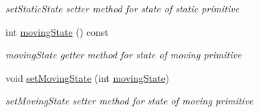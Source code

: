 \begin{DoxyCompactItemize}
\begin{DoxyCompactList}\small\item\em set\+Static\+State setter method for state of static primitive \end{DoxyCompactList}\item 
int \hyperlink{class_canvas_a8097ff7e44fb5fecf0dd0997e13e4c32}{moving\+State} () const
\begin{DoxyCompactList}\small\item\em moving\+State getter method for state of moving primitive \end{DoxyCompactList}\item 
void \hyperlink{class_canvas_a3ec03d6ae21250fcc0b0a3164f701933}{set\+Moving\+State} (int \hyperlink{class_canvas_a8097ff7e44fb5fecf0dd0997e13e4c32}{moving\+State})
\begin{DoxyCompactList}\small\item\em set\+Moving\+State setter method for state of moving primitive \end{DoxyCompactList}\end{DoxyCompactItemize}
